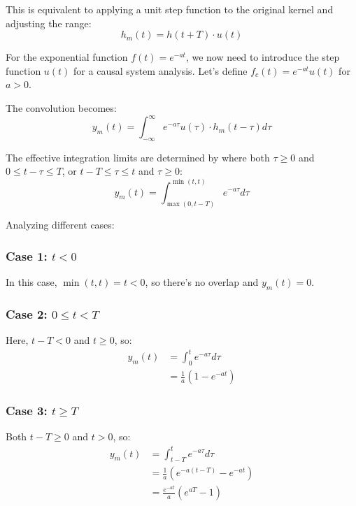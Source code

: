 \documentclass{article}
\begin{document}
	This is equivalent to applying a unit step function to the original kernel and adjusting the range:
	\begin{equation}
		h_m(t) = h(t+T) \cdot u(t)
	\end{equation}
	
	For the exponential function $f(t) = e^{-at}$, we now need to introduce the step function $u(t)$ for a causal system analysis. Let's define $f_c(t) = e^{-at}u(t)$ for $a > 0$.
	
	The convolution becomes:
	\begin{equation}
		y_m(t) = \int_{-\infty}^{\infty} e^{-a\tau}u(\tau) \cdot h_m(t - \tau) d\tau
	\end{equation}
	
	The effective integration limits are determined by where both $\tau \geq 0$ and $0 \leq t - \tau \leq T$, or $t - T \leq \tau \leq t$ and $\tau \geq 0$:
	\begin{equation}
		y_m(t) = \int_{\max(0, t-T)}^{\min(t, t)} e^{-a\tau} d\tau
	\end{equation}
	
	Analyzing different cases:
	
	\subsubsection{Case 1: $t < 0$}
	In this case, $\min(t, t) = t < 0$, so there's no overlap and $y_m(t) = 0$.
	
	\subsubsection{Case 2: $0 \leq t < T$}
	Here, $t - T < 0$ and $t \geq 0$, so:
	\begin{align}
		y_m(t) &= \int_{0}^{t} e^{-a\tau} d\tau \\
		&= \frac{1}{a}(1 - e^{-at})
	\end{align}
	
	\subsubsection{Case 3: $t \geq T$}
	Both $t - T \geq 0$ and $t > 0$, so:
	\begin{align}
		y_m(t) &= \int_{t-T}^{t} e^{-a\tau} d\tau \\
		&= \frac{1}{a}(e^{-a(t-T)} - e^{-at}) \\
		&= \frac{e^{-at}}{a}(e^{aT} - 1)
	\end{align}
	
\end{document}
